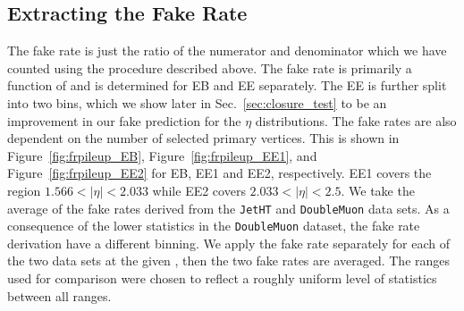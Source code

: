 \subsection{Extracting the Fake Rate}

The fake rate is just the ratio of the numerator and denominator which we have counted using the procedure described above. The fake rate is primarily a function of \pt and is determined for EB and EE separately. The EE is further split into two bins, which we show later in Sec.~\ref{sec:closure_test} to be an improvement in our fake prediction for the $\eta$ distributions. The fake rates are also dependent on the number of selected primary vertices. This is shown in Figure~\ref{fig:frpileup_EB}, Figure~\ref{fig:frpileup_EE1}, and Figure~\ref{fig:frpileup_EE2} for EB, EE1 and EE2, respectively. EE1 covers the region $1.566 < |\eta| < 2.033$ while EE2 covers $2.033 < \lvert \eta \rvert< 2.5$. We take the average of the fake rates derived from the \texttt{JetHT} and \texttt{DoubleMuon} data sets. As a consequence of the lower statistics in the \texttt{DoubleMuon} dataset, the fake rate derivation have a different \pt binning. We apply the fake rate separately for each of the two data sets at the given \pt, then the two fake rates are averaged. The ranges used for comparison were chosen to reflect a roughly uniform level of statistics between all ranges.

